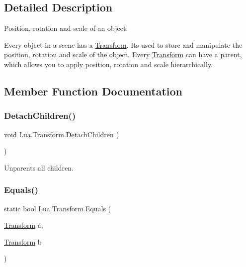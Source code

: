 \subsection{Detailed Description}
Position, rotation and scale of an object. 

Every object in a scene has a \mbox{\hyperlink{class_lua_1_1_transform}{Transform}}. It\textquotesingle{}s used to store and manipulate the position, rotation and scale of the object. Every \mbox{\hyperlink{class_lua_1_1_transform}{Transform}} can have a parent, which allows you to apply position, rotation and scale hierarchically. 

\subsection{Member Function Documentation}
\mbox{\label{class_lua_1_1_transform_a13e71ef2426543323d6f74d05d9904d0}} 
\subsubsection{\texorpdfstring{DetachChildren()}{DetachChildren()}}
{\footnotesize\ttfamily void Lua.\+Transform.\+Detach\+Children (\begin{DoxyParamCaption}{ }\end{DoxyParamCaption})}



Unparents all children. 

\mbox{\label{class_lua_1_1_transform_a17093d64239d0605cfdd83d9154fcf08}} 
\subsubsection{\texorpdfstring{Equals()}{Equals()}}
{\footnotesize\ttfamily static bool Lua.\+Transform.\+Equals (\begin{DoxyParamCaption}\item[{\mbox{\hyperlink{class_lua_1_1_transform}{Transform}}}]{a,  }\item[{\mbox{\hyperlink{class_lua_1_1_transform}{Transform}}}]{b }\end{DoxyParamCaption})\hspace{0.3cm}{\ttfamily [static]}}



